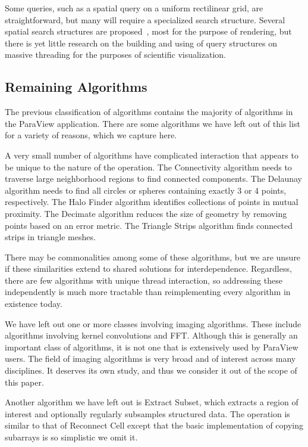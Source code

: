 \documentclass{sig-alternate}
\newcommand*{\lcite}[1]{~\cite{#1}}
\newcommand{\algclass}[1]{\textsf{#1}}
\newcommand{\alg}[1]{#1}
\newcommand{\algorithmclasssection}[1]{\subsection*{#1}}
\begin{document}
Some queries, such as a spatial query on a uniform rectilinear grid, are
straightforward, but many will require a specialized search
structure. Several spatial search structures are
proposed\lcite{Foley2005,Kalojanov2009,Kalojanov2011,Zhou2008,Zhou2010},
most for the purpose of rendering, but there is yet little research on the
building and using of query structures on massive threading for the
purposes of scientific visualization.


\algorithmclasssection{Remaining Algorithms}

\noindent
The previous classification of algorithms contains the majority of
algorithms in the ParaView application. There are some algorithms we have
left out of this list for a variety of reasons, which we capture here.

A very small number of algorithms have complicated interaction that appears
to be unique to the nature of the operation. The \alg{Connectivity}
algorithm needs to traverse large neighborhood regions to find connected
components. The \alg{Delaunay} algorithm needs to find all circles or
spheres containing exactly 3 or 4 points, respectively. The \alg{Halo
  Finder} algorithm identifies collections of points in mutual
proximity. The \alg{Decimate} algorithm reduces the size of geometry by
removing points based on an error metric. The \alg{Triangle Strips}
algorithm finds connected strips in triangle meshes.

There may be commonalities among some of these algorithms, but we are
unsure if these similarities extend to shared solutions for
interdependence.  Regardless, there are few algorithms with unique thread
interaction, so addressing these independently is much more tractable than
reimplementing every algorithm in existence today.

We have left out one or more classes involving imaging algorithms. These
include algorithms involving kernel convolutions and \alg{FFT}. Although
this is generally an important class of algorithms, it is not one that is
extensively used by ParaView users. The field of imaging algorithms is very
broad and of interest across many disciplines. It deserves its own study,
and thus we consider it out of the scope of this paper.

Another algorithm we have left out is \alg{Extract Subset}, which extracts
a region of interest and optionally regularly subsamples structured
data. The operation is similar to that of \algclass{Reconnect Cell} except
that the basic implementation of copying subarrays is so simplistic we omit
it.
\end{document}
